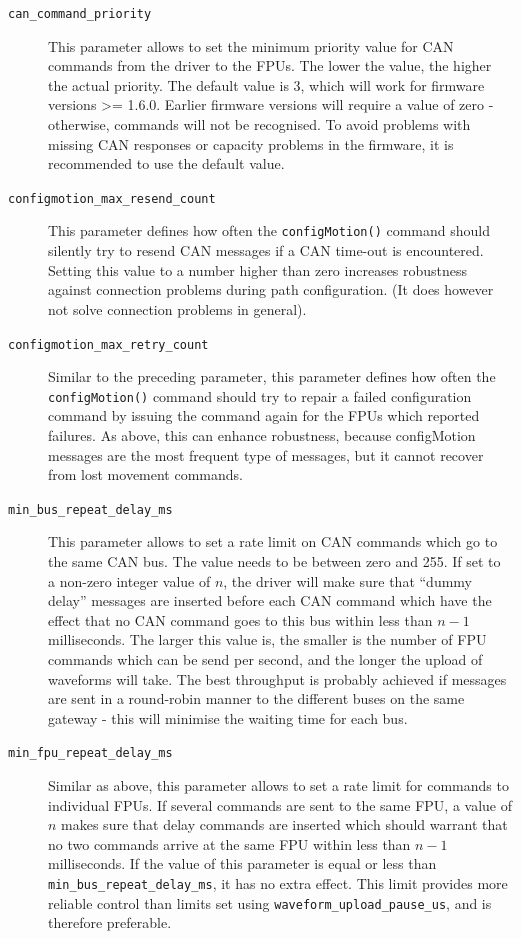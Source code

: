 \documentclass[fontsize=12,a4paper]{scrreprt}
\begin{document}
\begin{description}
\item[\texttt{can\_command\_priority}] This parameter allows to set
  the minimum priority value for CAN commands from the driver to the
  FPUs. The lower the value, the higher the actual priority.  The
  default value is 3, which will work for firmware versions >= 1.6.0.
  Earlier firmware versions will require a value of zero - otherwise,
  commands will not be recognised. To avoid problems with missing CAN
  responses or capacity problems in the firmware, it is recommended to
  use the default value.

\item[\texttt{configmotion\_max\_resend\_count}] This parameter
  defines how often the \texttt{configMotion()} command should silently
  try to resend CAN messages if a CAN time-out is encountered.
  Setting this value to a number higher than zero increases
  robustness against connection problems during path configuration.
  (It does however not solve connection problems in general).

\item[\texttt{configmotion\_max\_retry\_count}] Similar to the preceding
  parameter, this parameter defines how often the \texttt{configMotion()}
  command should try to repair a failed configuration command by
  issuing the command again for the FPUs which reported failures.
  As above, this can enhance robustness, because configMotion messages
  are the most frequent type of messages, but it cannot recover
  from lost movement commands.

\item[\texttt{min\_bus\_repeat\_delay\_ms}] This parameter allows to
  set a rate limit on CAN commands which go to the same CAN bus. The
  value needs to be between zero and 255. If set to a non-zero integer
  value of $n$, the driver will make sure that ``dummy delay''
  messages are inserted before each CAN command which have the effect
  that no CAN command goes to this bus within less than $n-1$
  milliseconds. The larger this value is, the smaller is the number of
  FPU commands which can be send per second, and the longer the upload
  of waveforms will take. The best throughput is probably achieved if
  messages are sent in a round-robin manner to the different buses on
  the same gateway - this will minimise the waiting time for each bus.

\item[\texttt{min\_fpu\_repeat\_delay\_ms}] Similar as above, this
  parameter allows to set a rate limit for commands to individual
  FPUs. If several commands are sent to the same FPU, a value of $n$
  makes sure that delay commands are inserted which should warrant
  that no two commands arrive at the same FPU within less than $n-1$
  milliseconds. If the value of this parameter is equal or less than
  \texttt{min\_bus\_repeat\_delay\_ms}, it has no extra effect. This
  limit provides more reliable control than limits set using
  \texttt{waveform\_upload\_pause\_us}, and is therefore preferable.


\end{description}
\end{document}
